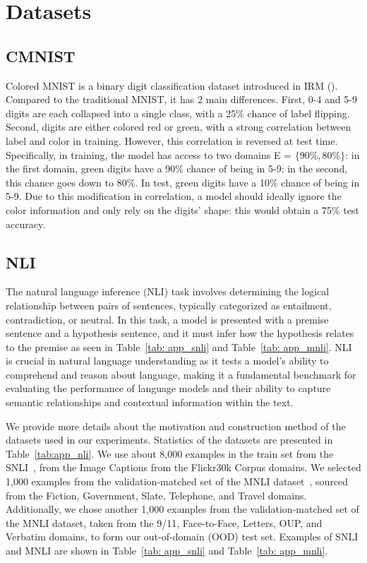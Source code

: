 \section{Datasets}
\subsection{CMNIST}
Colored MNIST is a binary digit classification dataset introduced in IRM (\cite{irmv1}). Compared to the traditional
MNIST, it has 2 main differences. 
First, 0-4 and 5-9 digits are each collapsed into a single class, with a
25\% chance of label flipping. 
Second, digits are either colored red or green, with a strong correlation between label and
color in training. 
However, this correlation is reversed at test time. 
Specifically, in training, the model has access to two
domains E = $\{90\%, 80\%\}$: in the first domain, green digits have a 90\% chance of being in 5-9; in the second, this chance goes down to 80\%. 
In test, green digits have a 10\% chance of being in 5-9. Due to this modification in correlation, a model
should ideally ignore the color information and only rely on the digits’ shape: this would obtain a 75\% test accuracy.


\subsection{NLI}
The natural language inference (NLI) task involves determining the logical relationship between pairs of sentences, typically categorized as entailment, contradiction, or neutral.
In this task, a model is presented with a premise sentence and a hypothesis sentence, and it must infer how the hypothesis relates to the premise as seen in Table~\ref{tab: app_snli} and Table~\ref{tab: app_mnli}. 
NLI is crucial in natural language understanding as it tests a model's ability to comprehend and reason about language, making it a fundamental benchmark for evaluating the performance of language models and their ability to capture semantic relationships and contextual information within the text.

We provide more details about the motivation and construction method of the datasets used in our experiments. Statistics of the datasets are presented in Table~\ref{tab:app_nli}.
We use about 8,000 examples in the train set from the SNLI~\cite{SNLI}, from the Image Captions from the Flickr30k Corpus domains.
We selected 1,000 examples from the validation-matched set of the MNLI dataset~\citep{MNLI}, sourced from the Fiction, Government, Slate, Telephone, and Travel domains. Additionally, we chose another 1,000 examples from the validation-matched set of the MNLI dataset, taken from the 9/11, Face-to-Face, Letters, OUP, and Verbatim domains, to form our out-of-domain (OOD) test set.
Examples of SNLI and MNLI are shown in Table~\ref{tab: app_snli} and Table~\ref{tab: app_mnli}.

